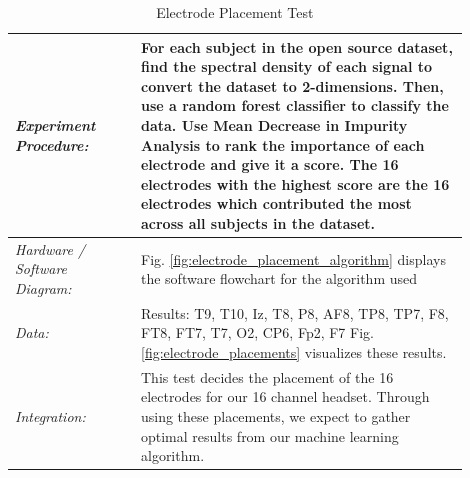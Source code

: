 \documentclass[conference]{IEEEtran}
\begin{document}
\begin{table}[!ht]
\begin{tabular}{|>{\columncolor{black!5}}p{0.25\linewidth}|>{}p{0.65\linewidth}|}
            \textit{Experiment Procedure:} & For each subject in the open source dataset, find the spectral density of each signal to convert the dataset to 2-dimensions. Then, use a random forest classifier to classify the data. Use Mean Decrease in Impurity Analysis to rank the importance of each electrode and give it a score. The 16 electrodes with the highest score are the 16 electrodes which contributed the most across all subjects in the dataset.

            \\ \hline 

            \textit{Hardware / Software Diagram: } & Fig. \ref{fig:electrode_placement_algorithm} displays the software flowchart for the algorithm used

            \\ \hline 

            \textit{Data:} & Results: 
                T9, T10, Iz, T8, P8, AF8, TP8, TP7, F8, FT8, FT7, T7, O2, CP6, Fp2, F7 \newline Fig. \ref{fig:electrode_placements} visualizes these results.

            \\ \hline 

            \textit{Integration:} & This test decides the placement of the 16 electrodes for our 16 channel headset. Through using these placements, we expect to gather optimal results from our machine learning algorithm. 
            \\ \hline
             
        \end{tabular}           
        \caption{Electrode Placement Test}
        \label{tab:electrode_placement_test}
    \end{table} 
\end{document}
